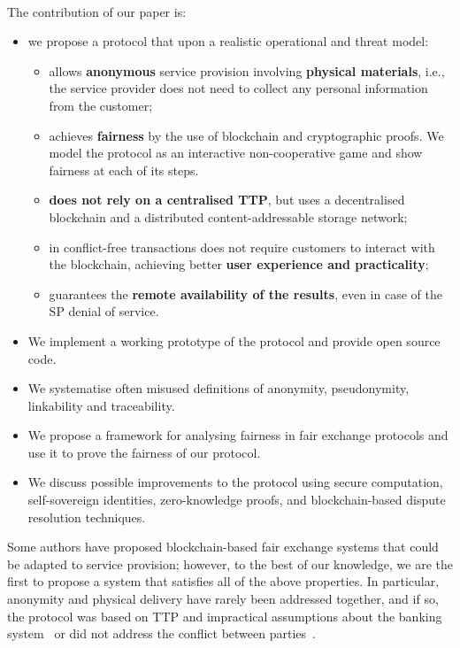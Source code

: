 \documentclass[pdftex,twocolumn,epjc3]{svjour3}
\begin{document}
\paragraph{}
The contribution of our paper is:
\begin{itemize}
\item we propose a protocol that upon a realistic operational and threat model:
  \begin{itemize}
  \item allows \textbf{anonymous} service provision involving \textbf{physical materials}, i.e., the service provider does not need to collect any personal information from the customer;
  \item achieves \textbf{fairness} by the use of blockchain and cryptographic proofs. We model the protocol as an interactive non-cooperative game and show fairness at each of its steps.
  \item \textbf{does not rely on a centralised TTP}, but uses a decentralised blockchain and a distributed content-addressable storage network;
  \item in conflict-free transactions does not require customers to interact with the blockchain, achieving better \textbf{user experience and practicality};
  \item guarantees the \textbf{remote availability of the results}, even in case of the SP denial of service.
  \end{itemize} 
\item We implement a working prototype of the protocol and provide open source code.
\item We systematise often misused definitions of anonymity, pseudonymity, linkability and traceability.
\item We propose a framework for analysing fairness in fair exchange protocols and use it to prove the fairness of our protocol.
\item We discuss possible improvements to the protocol using secure computation, self-sovereign identities, zero-knowledge proofs, and blockchain-based dispute resolution techniques.
\end{itemize}

Some authors have proposed blockchain-based fair exchange systems that could be adapted to service provision; however, to the best of our knowledge, we are the first to propose a system that satisfies all of the above properties. In particular, anonymity and physical delivery have rarely been addressed together, and if so, the protocol was based on TTP and impractical assumptions about the banking system~\cite{birjoveanuAnonymityFairexchangeEcommerce2015} or did not address the conflict between parties~\cite{altawyLelantosBlockchainBasedAnonymous2017}.
\end{document}
